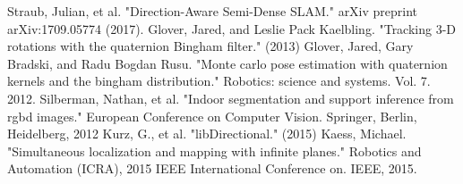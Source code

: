 \documentclass[12pt]{article}
\begin{document}
\begin{thebibliography}{9}
\scriptsize 
{}
Straub, Julian, et al. "Direction-Aware Semi-Dense SLAM." arXiv preprint arXiv:1709.05774 (2017).
Glover, Jared, and Leslie Pack Kaelbling. "Tracking 3-D rotations with the quaternion Bingham filter." (2013)
Glover, Jared, Gary Bradski, and Radu Bogdan Rusu. "Monte carlo pose estimation with quaternion kernels and the bingham distribution." Robotics: science and systems. Vol. 7. 2012.
Silberman, Nathan, et al. "Indoor segmentation and support inference from rgbd images." European Conference on Computer Vision. Springer, Berlin, Heidelberg, 2012
Kurz, G., et al. "libDirectional." (2015)
Kaess, Michael. "Simultaneous localization and mapping with infinite planes." Robotics and Automation (ICRA), 2015 IEEE International Conference on. IEEE, 2015.

\end{thebibliography}
\end{document}
